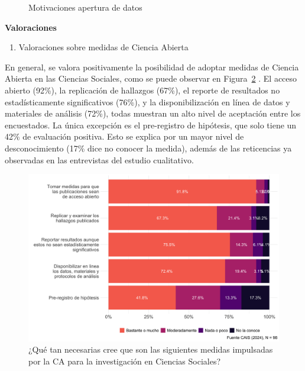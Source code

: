 \documentclass[
  letterpaper,
  DIV=11,
  numbers=noendperiod]{scrreprt}
\providecommand{\tightlist}{%
  \setlength{\itemsep}{0pt}\setlength{\parskip}{0pt}}\usepackage{longtable,booktabs,array}
\begin{document}
\begin{figure}
\begin{minipage}[t]{\linewidth}
{{}

}

\end{minipage}%

\caption{\label{fig-motivaciones-grid}Motivaciones apertura de datos}

\end{figure}

\textbf{Valoraciones}

\begin{enumerate}
\def\labelenumi{\alph{enumi})}
\tightlist
\item
  Valoraciones sobre medidas de Ciencia Abierta
\end{enumerate}

En general, se valora positivamente la posibilidad de adoptar medidas de
Ciencia Abierta en las Ciencias Sociales, como se puede observar en
Figura~\ref{fig-val} . El acceso abierto (92\%), la replicación de
hallazgos (67\%), el reporte de resultados no estadísticamente
significativos (76\%), y la disponibilización en línea de datos y
materiales de análisis (72\%), todas muestran un alto nivel de
aceptación entre los encuestados. La única excepción es el pre-registro
de hipótesis, que solo tiene un 42\% de evaluación positiva. Esto se
explica por un mayor nivel de desconocimiento (17\% dice no conocer la
medida), además de las reticencias ya observadas en las entrevistas del
estudio cualitativo.

\begin{figure}

{\centering \includegraphics{paper_files/figure-pdf/fig-val-1.png}

}

\caption{\label{fig-val}¿Qué tan necesarias cree que son las siguientes
medidas impulsadas por la CA para la investigación en Ciencias
Sociales?}

\end{figure}
\end{document}
